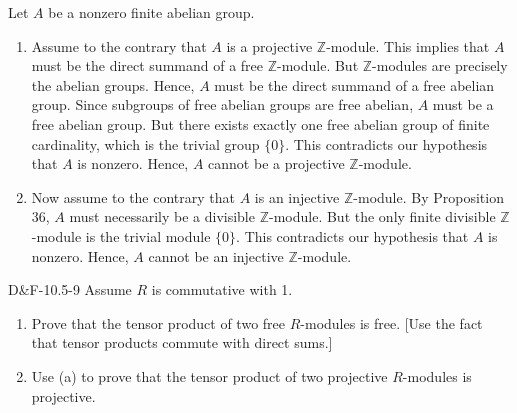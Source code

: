 \documentclass{article}
\begin{document}
	Let $A$ be a nonzero finite abelian group. \vspace{-0.25cm}
	\begin{enumerate}[itemsep =-2pt,label = (\alph{*})]
		\item Assume to the contrary that $A$ is a projective $\mathbb{Z}$-module. This implies that $A$ must be the direct summand of a free $\mathbb{Z}$-module. But $\mathbb{Z}$-modules are precisely the abelian groups. Hence, $A$ must be the direct summand of a free abelian group. Since subgroups of free abelian groups are free abelian, $A$ must be a free abelian group. But there exists exactly one free abelian group of finite cardinality, which is the trivial group $\{0\}$. This contradicts our hypothesis that $A$ is nonzero. Hence, $A$ cannot be a projective $\mathbb{Z}$-module. 
		\item Now assume to the contrary that $A$ is an injective $\mathbb{Z}$-module. By Proposition 36, $A$ must necessarily be a divisible $\mathbb{Z}$-module. But the only finite divisible $\mathbb{Z}$-module is the trivial module $\{0\}$. This contradicts our hypothesis that $A$ is nonzero. Hence, $A$ cannot be an injective $\mathbb{Z}$-module. 
	\end{enumerate}
	
	\begin{prb}{D\&F-10.5-9}
		Assume $R$ is commutative with 1. \vspace{-0.25cm} 
		\begin{enumerate}[itemsep =-2pt,label = \textbf{(\alph{*})}]
			\item Prove that the tensor product of two free $R$-modules is free. [Use the fact that tensor products commute with direct sums.]
			\item Use (a) to prove that the tensor product of two projective $R$-modules is projective. 
		\end{enumerate}
	\end{prb}
	
\end{document}
